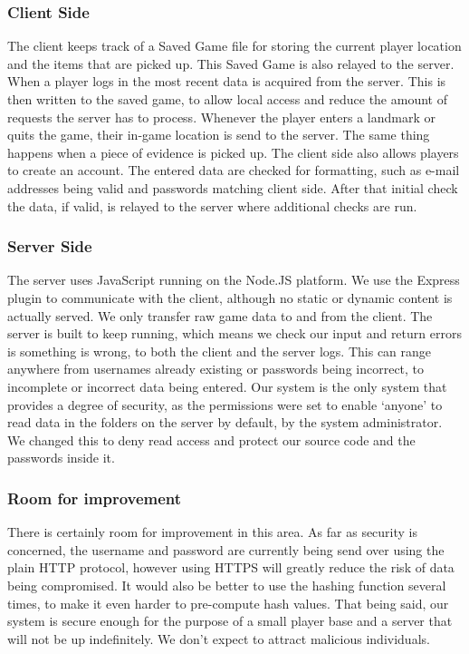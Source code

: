 \documentclass{article}
\begin{document}
\subsubsection{Client Side}
The client keeps track of a Saved Game file for storing the current player location and the items that are picked up. This Saved Game is also relayed to the server. When a player logs in the most recent data is acquired from the server. This is then written to the saved game, to allow local access and reduce the amount of requests the server has to process. Whenever the player enters a landmark or quits the game, their in-game location is send to the server. The same thing happens when a piece of evidence is picked up. The client side also allows players to create an account. The entered data are checked for formatting, such as e-mail addresses being valid and passwords matching client side. After that initial check the data, if valid, is relayed to the server where additional checks are run.
\subsubsection{Server Side}
The server uses JavaScript running on the Node.JS platform. We use the Express plugin to communicate with the client, although no static or dynamic content is actually served. We only transfer raw game data to and from the client. The server is built to keep running, which means we check our input and return errors is something is wrong, to both the client and the server logs. This can range anywhere from usernames already existing or passwords being incorrect, to incomplete or incorrect data being entered. Our system is the only system that provides a degree of security, as the permissions were set to enable ‘anyone’ to read data in the folders on the server by default, by the system administrator. We changed this to deny read access and protect our source code and the passwords inside it.
\subsubsection{Room for improvement}
There is certainly room for improvement in this area. As far as security is concerned, the username and password are currently being send over using the plain HTTP protocol, however using HTTPS will greatly reduce the risk of data being compromised. It would also be better to use the hashing function several times, to make it even harder to pre-compute hash values. That being said, our system is secure enough for the purpose of a small player base and a server that will not be up indefinitely. We don’t expect to attract malicious individuals.
\end{document}
